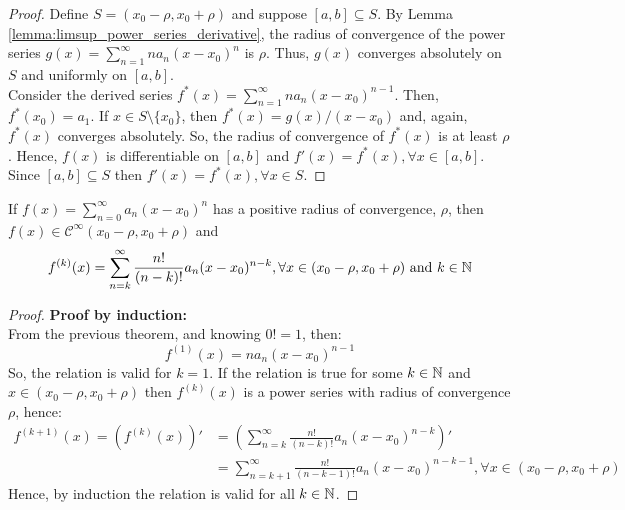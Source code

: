 \begin{proof}
    Define $S = (x_0 - \rho, x_0 + \rho)$ and suppose $[a,b] \subseteq S$. By Lemma \ref{lemma:limsup_power_series_derivative}, the radius of convergence of the power series $g(x) = \sum_{n=1}^\infty n a_n (x - x_0)^n$ is $\rho$. Thus, $g(x)$ converges absolutely on $S$ and uniformly on $[a,b]$.\\
    Consider the derived series $f^{*}(x) = \sum_{n=1}^\infty n a_n (x - x_0)^{n-1}$. Then, $f^{*}(x_0) = a_1$. If $x \in S \setminus \{x_0\}$, then $f^{*}(x) = g(x)/(x - x_0)$ and, again, $f^{*}(x)$ converges absolutely. So, the radius of convergence of $f^{*}(x)$ is at least $\rho$. Hence, $f(x)$ is differentiable on $[a,b]$ and $f'(x) = f^{*}(x), \forall x \in [a,b]$. Since $[a,b] \subseteq S$ then $f'(x) = f^{*}(x), \forall x \in S$.
\end{proof}

\begin{corollary}
    \label{corollary:k-th_der_power_series}
    If $f(x) = \sum_{n=0}^\infty a_n (x-x_0)^n$ has a positive radius of convergence, $\rho$, then $f(x) \in \mathcal{C}^\infty(x_0 - \rho, x_0 + \rho)$ and
    \begin{equation*}
        f^{(k)}(x) = \sum \limits_{n = k}^\infty \frac{n!}{(n-k)!}a_n (x - x_0)^{n-k}, \forall x \in (x_0 - \rho, x_0 + \rho) \text{ and } k \in \mathbb{N}
    \end{equation*}
\end{corollary}

\begin{proof}
    \textbf{Proof by induction:}\\
    From the previous theorem, and knowing $0! = 1$, then:
    \begin{equation*}
        f^{(1)}(x) = n a_n (x - x_0)^{n-1}
    \end{equation*}
    So, the relation is valid for $k = 1$. If the relation is true for some $k \in \mathbb{N}$ and $x \in (x_0 - \rho, x_0 + \rho)$ then $f^{(k)}(x)$ is a power series with radius of convergence $\rho$, hence:
    \begin{align*}
        f^{(k+1)}(x) = (f^{(k)}(x))' &= \left(
            \sum \limits_{n=k}^\infty \frac{n!}{(n-k)!}a_n (x-x_0)^{n-k}
        \right)' \\
        &= \sum \limits_{n = k + 1}^\infty \frac{n!}{(n-k-1)!}a_n (x - x_0)^{n-k-1}, \forall x \in (x_0 - \rho, x_0 + \rho)
    \end{align*}
    Hence, by induction the relation is valid for all $k \in \mathbb{N}$.
\end{proof}

